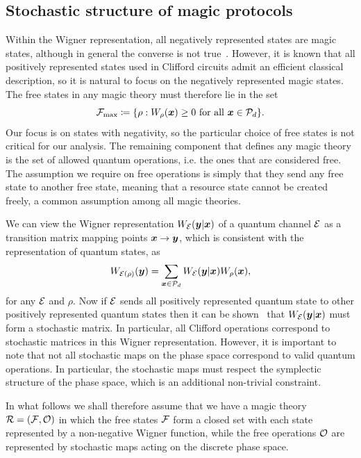 \documentclass[pra,
aps,
twocolumn,
superscriptaddress,
groupedaddress,
nofootinbib,
reprint
]{revtex4-1}
\begin{document}

\subsection{Stochastic structure of magic protocols}
\label{sec:struc}

Within the Wigner representation, all negatively represented states are magic states, although in general the converse is not true~\cite{cit:campbell}. However, it is known that all positively represented states used in Clifford circuits admit an efficient classical description, so it is natural to focus on the negatively represented magic states. The free states in any magic theory must therefore lie in the set
\begin{equation}
    \Fmax \coloneqq \{ \rho: \W[\bmx]{\rho} \geq 0 \text{ for all } \bmx \in \cal{P}_d\}.
\end{equation}
Our focus is on states with negativity, so the particular choice of free states is not critical for our analysis. The remaining component that defines any magic theory is the set of allowed quantum operations, i.e. the ones that are considered free. The assumption we require on free operations is simply that they send any free state to another free state, meaning that a resource state cannot be created freely, a common assumption among all magic theories.

We can view the Wigner representation $W_{{\mathcal E}}( \boldsymbol{y} | \boldsymbol{x})$ of a quantum channel ${\mathcal E}$ as a transition matrix mapping points $\boldsymbol{x} \rightarrow \boldsymbol{y}$, which is consistent with the representation of quantum states, as
\begin{equation}
	W_{{\mathcal E}(\rho)} (\boldsymbol{y}) = \sum_{\boldsymbol{x} \in {\mathcal P}_d} W_{{\mathcal E}}( \boldsymbol{y} | \boldsymbol{x}) W_\rho(\boldsymbol{x}),
\end{equation}
for any ${\mathcal E}$ and $\rho$. Now if ${\mathcal E}$ sends all positively represented quantum state to other positively represented quantum states then it can be shown~\cite{Wang_2019} that $W_{{\mathcal E}}(\boldsymbol{y} |\boldsymbol{x})$ must form a stochastic matrix. In particular, all Clifford operations correspond to stochastic matrices in this Wigner representation. However, it is important to note that not all stochastic maps on the phase space correspond to valid quantum operations. In particular, the stochastic maps must respect the symplectic structure of the phase space, which is an additional non-trivial constraint.

In what follows we shall therefore assume that we have a magic theory ${\mathcal R} = ({\mathcal F}, {\mathcal O})$ in which the free states ${\mathcal F}$ form a closed set with each state represented by a non-negative Wigner function, while the free operations ${\mathcal O}$ are represented by stochastic maps acting on the discrete phase space.
\end{document}
